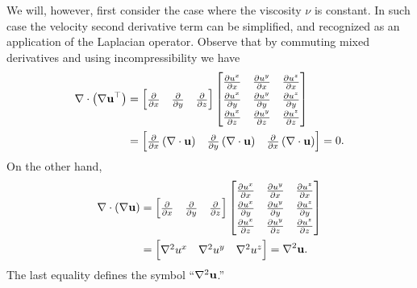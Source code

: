 We will, however, first consider the case where the viscosity $\nu$ is constant.  In such case the velocity second derivative term can be simplified, and recognized as an application of the Laplacian operator.  Observe that by commuting mixed derivatives and using incompressibility we have
\begin{align*}
\Div \left(\grad \bu^{\top}\right) &= \renewcommand{\arraystretch}{1.3}\begin{bmatrix}
    \frac{\partial}{\partial x} & \frac{\partial}{\partial y} & \frac{\partial}{\partial z}
    \end{bmatrix}
    \begin{bmatrix}
    \frac{\partial u^x}{\partial x} & \frac{\partial u^y}{\partial x} & \frac{\partial u^z}{\partial x} \\
    \frac{\partial u^x}{\partial y} & \frac{\partial u^y}{\partial y} & \frac{\partial u^z}{\partial y} \\
    \frac{\partial u^x}{\partial z} & \frac{\partial u^y}{\partial z} & \frac{\partial u^z}{\partial z}
    \end{bmatrix} \\
  &= \begin{bmatrix}
    \frac{\partial}{\partial x}\left(\Div \bu\right) & \frac{\partial}{\partial y }\left(\Div \bu\right) & \frac{\partial}{\partial x} \left(\Div \bu\right)
    \end{bmatrix}
    = 0.
\end{align*}
On the other hand,
\begin{align*}
\Div \left(\grad \bu\right) &= \renewcommand{\arraystretch}{1.3}\begin{bmatrix}
    \frac{\partial}{\partial x} & \frac{\partial}{\partial y} & \frac{\partial}{\partial z}
    \end{bmatrix}
    \begin{bmatrix}
    \frac{\partial u^x}{\partial x} & \frac{\partial u^y}{\partial x} & \frac{\partial u^z}{\partial x} \\
    \frac{\partial u^x}{\partial y} & \frac{\partial u^y}{\partial y} & \frac{\partial u^z}{\partial y} \\
    \frac{\partial u^x}{\partial z} & \frac{\partial u^y}{\partial z} & \frac{\partial u^z}{\partial z}
    \end{bmatrix} \\
  &= \begin{bmatrix} \grad^2 u^x & \grad^2 u^y & \grad^2 u^z \end{bmatrix} = \grad^2 \bu.
\end{align*}
The last equality defines the symbol ``$\nabla^2 \mathbf{u}$.''

